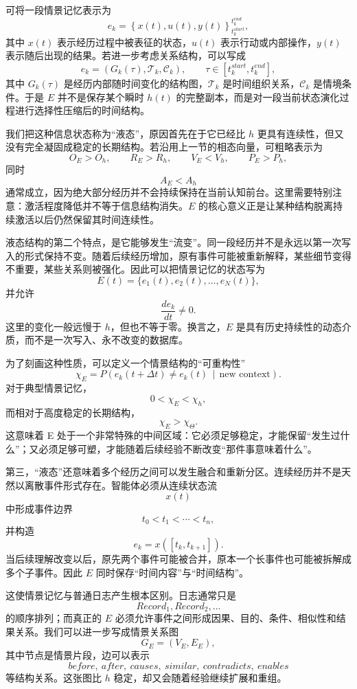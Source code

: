可将一段情景记忆表示为
\[
e_k
=
\left\{
x(t),u(t),y(t)
\right\}_{t_k^{start}}^{t_k^{end}},
\]
其中 $x(t)$ 表示经历过程中被表征的状态，$u(t)$ 表示行动或内部操作，$y(t)$ 表示随后出现的结果。若进一步考虑关系结构，可以写成
\[
e_k=
\left(
G_k(\tau),
\mathcal T_k,
\mathcal C_k
\right),
\qquad
\tau\in[t_k^{start},t_k^{end}],
\]
其中 $G_k(\tau)$ 是经历内部随时间变化的结构图，$\mathcal T_k$ 是时间组织关系，$\mathcal C_k$ 是情境条件。于是 $E$ 并不是保存某个瞬时 $h(t)$ 的完整副本，而是对一段当前状态演化过程进行选择性压缩后的时间结构。

我们把这种信息状态称为“液态”，原因首先在于它已经比 $h$ 更具有连续性，但又没有完全凝固成稳定的长期结构。若沿用上一节的相态向量，可粗略表示为
\[
O_E>O_h,\qquad
R_E>R_h,\qquad
V_E<V_h,\qquad
P_E>P_h,
\]
同时
\[
A_E<A_h
\]
通常成立，因为绝大部分经历并不会持续保持在当前认知前台。这里需要特别注意：激活程度降低并不等于信息结构消失。$E$ 的核心意义正是让某种结构脱离持续激活以后仍然保留其时间连续性。

液态结构的第二个特点，是它能够发生“流变”。同一段经历并不是永远以第一次写入的形式保持不变。随着后续经历增加，原有事件可能被重新解释，某些细节变得不重要，某些关系则被强化。因此可以把情景记忆的状态写为
\[
E(t)
=
\{e_1(t),e_2(t),\ldots,e_N(t)\},
\]
并允许
\[
\frac{de_k}{dt}\neq 0.
\]
这里的变化一般远慢于 $h$，但也不等于零。换言之，$E$ 是具有历史持续性的动态介质，而不是一次写入、永不改变的数据库。

为了刻画这种性质，可以定义一个情景结构的“可重构性”
\[
\chi_E
=
P
\left(
e_k(t+\Delta t)\neq e_k(t)
\,\middle|\,
\text{new context}
\right).
\]
对于典型情景记忆，
\[
0<\chi_E<\chi_h,
\]
而相对于高度稳定的长期结构，
\[
\chi_E>\chi_\Theta.
\]
这意味着 E 处于一个非常特殊的中间区域：它必须足够稳定，才能保留“发生过什么”；又必须足够可塑，才能随着后续经验不断改变“那件事意味着什么”。

第三，“液态”还意味着多个经历之间可以发生融合和重新分区。连续经历并不是天然以离散事件形式存在。智能体必须从连续状态流
\[
x(t)
\]
中形成事件边界
\[
t_0<t_1<\cdots<t_n,
\]
并构造
\[
e_k=x([t_k,t_{k+1}]).
\]
当后续理解改变以后，原先两个事件可能被合并，原本一个长事件也可能被拆解成多个子事件。因此 $E$ 同时保存“时间内容”与“时间结构”。

这使情景记忆与普通日志产生根本区别。日志通常只是
\[
Record_1,Record_2,\ldots
\]
的顺序排列；而真正的 $E$ 必须允许事件之间形成因果、目的、条件、相似性和结果关系。我们可以进一步写成情景关系图
\[
G_E=
(V_E,E_E),
\]
其中节点是情景片段，边可以表示
\[
before,\ after,\ causes,\ similar,\ contradicts,\ enables
\]
等结构关系。这张图比 $h$ 稳定，却又会随着经验继续扩展和重组。

